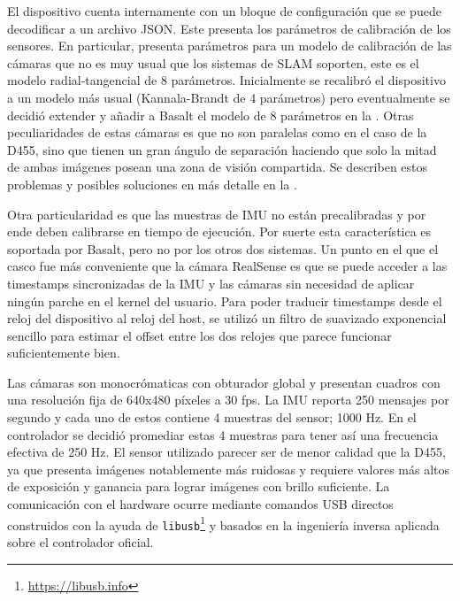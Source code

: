 \documentclass[ twoside,openright,titlepage,numbers=noenddot,%
                headinclude,footinclude,cleardoublepage=empty,abstract=on,
                BCOR=-5mm,paper=a4,fontsize=11pt
                ]{scrreprt}
\newcommand{\passthrough}[1]{#1}
\begin{document}
El dispositivo cuenta internamente con un bloque de configuración que se
puede decodificar a un archivo JSON. Este presenta los parámetros de
calibración de los sensores. En particular, presenta parámetros para un
modelo de calibración de las cámaras que no es muy usual que los
sistemas de SLAM soporten, este es el modelo radial-tangencial
\autocite{brownDecenteringDistortionLenses1966} de 8 parámetros.
Inicialmente se recalibró el dispositivo a un modelo más usual
(Kannala-Brandt \autocite{kannalaGenericCameraModel2006} de 4
parámetros) pero eventualmente se decidió extender y añadir a Basalt el
modelo de 8 parámetros en la . Otras peculiaridades
de estas cámaras es que no son paralelas como en el caso de la D455,
sino que tienen un gran ángulo de separación haciendo que solo la mitad
de ambas imágenes posean una zona de visión compartida. Se describen
estos problemas y posibles soluciones en más detalle en la
.

Otra particularidad es que las muestras de IMU no están precalibradas y
por ende deben calibrarse en tiempo de ejecución. Por suerte esta
característica es soportada por Basalt, pero no por los otros dos
sistemas. Un punto en el que el casco fue más conveniente que la cámara
RealSense es que se puede acceder a las timestamps sincronizadas de la
IMU y las cámaras sin necesidad de aplicar ningún parche en el kernel
del usuario. Para poder traducir timestamps desde el reloj del
dispositivo al reloj del host, se utilizó un filtro de suavizado
exponencial sencillo para estimar el offset entre los dos relojes que
parece funcionar suficientemente bien.

Las cámaras son monocrómaticas con obturador global y presentan cuadros
con una resolución fija de 640x480 píxeles a 30 fps. La IMU reporta 250
mensajes por segundo y cada uno de estos contiene 4 muestras del sensor;
1000 Hz. En el controlador se decidió promediar estas 4 muestras para
tener así una frecuencia efectiva de 250 Hz. El sensor utilizado parecer
ser de menor calidad que la D455, ya que presenta imágenes notablemente
más ruidosas y requiere valores más altos de exposición y ganancia para
lograr imágenes con brillo suficiente. La comunicación con el hardware
ocurre mediante comandos USB directos construidos con la ayuda de
\passthrough{\lstinline!libusb!}\footnote{\url{https://libusb.info}} y
basados en la ingeniería inversa aplicada sobre el controlador oficial.

\cleardoublepage
{}
\end{document}
